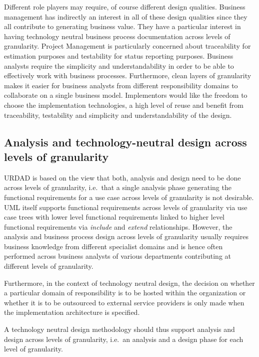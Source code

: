 Different role players may require, of course different design qualities. Business
management has indirectly an interest in all of these design qualities since they
all contribute to generating business value. They have a particular interest in
having technology neutral business process documentation across levels of granularity.
Project Management is particularly
concerned about traceability for estimation purposes and testability for status
reporting purposes. Business analysts require the simplicity and understandability
in order to be able to effectively work with business processes. Furthermore, clean
layers of granularity makes it easier for business analysts from different responsibility
domains to collaborate on a single business model. Implementors would like the freedom
to choose the implementation technologies, a high level of reuse and benefit from traceability,
testability and simplicity and understandability of the design.


\subsection{Analysis and technology-neutral design across levels of granularity}

URDAD is based on the view that both, analysis and design need to be done
across levels of granularity, i.e.\ that a single analysis phase generating
the functional requirements for a use case across levels of granularity
is not desirable. UML itself supports functional requirements across
levels of granularity via use case trees
with lower level functional requirements linked to higher level functional
requirements via {\em include} and {\em extend} relationships.
However, the analysis
and business process design across levels of granularity usually requires
business knowledge from different specialist domains and is hence often
performed across business analysts of various departments
contributing at different levels of granularity.

Furthermore, in the context of technology neutral design, the decision on
whether a particular domain of responsibility is to be hosted within the
organization or whether it is to be outsourced to external service providers is
only made when the implementation architecture is specified.

A technology neutral design methodology should thus support analysis and design
across levels of granularity, i.e.\ an analysis and a design phase for each
level of granularity.


